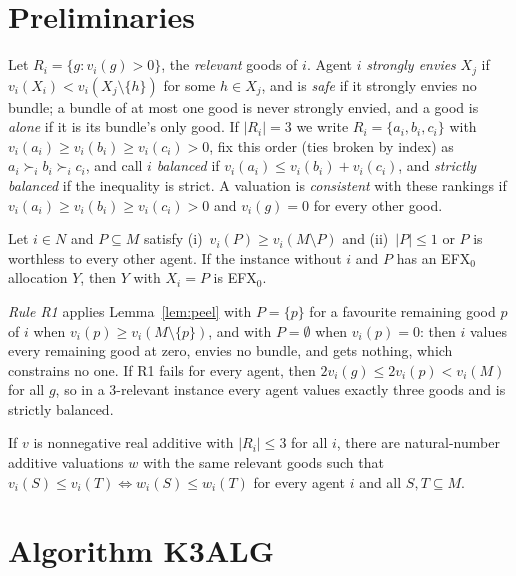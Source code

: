 \documentclass[runningheads,11pt]{llncs}
\newcommand{\efxz}{\texorpdfstring{\mbox{EFX$_0$}}{EFX0}}
\newcommand{\st}{\mathrel{:}}
\begin{document}
\section{Preliminaries}\label{sec:prelim}

Let $R_i=\{g\st v_i(g)>0\}$, the \emph{relevant} goods of $i$. Agent $i$ \emph{strongly envies} $X_j$ if $v_i(X_i)<v_i(X_j\setminus\{h\})$ for some $h\in X_j$, and is \emph{safe} if it strongly envies no bundle; a bundle of at most one good is never strongly envied, and a good is \emph{alone} if it is its bundle's only good. If $|R_i|=3$ we write $R_i=\{a_i,b_i,c_i\}$ with $v_i(a_i)\ge v_i(b_i)\ge v_i(c_i)>0$, fix this order (ties broken by index) as $a_i\succ_i b_i\succ_i c_i$, and call $i$ \emph{balanced} if $v_i(a_i)\le v_i(b_i)+v_i(c_i)$, and \emph{strictly balanced} if the inequality is strict. A valuation is \emph{consistent} with these rankings if $v_i(a_i)\ge v_i(b_i)\ge v_i(c_i)>0$ and $v_i(g)=0$ for every other good.

\begin{lemma}[peeling]\label{lem:peel}
Let $i\in N$ and $P\subseteq M$ satisfy (i)~$v_i(P)\ge v_i(M\setminus P)$ and (ii)~$|P|\le1$ or $P$ is worthless to every other agent. If the instance without $i$ and $P$ has an \efxz{} allocation $Y$, then $Y$ with $X_i=P$ is \efxz{}.
\end{lemma}

\noindent \emph{Rule R1} applies Lemma~\ref{lem:peel} with $P=\{p\}$ for a favourite remaining good $p$ of $i$ when $v_i(p)\ge v_i(M\setminus\{p\})$, and with $P=\emptyset$ when $v_i(p)=0$: then $i$ values every remaining good at zero, envies no bundle, and gets nothing, which constrains no one. If R1 fails for every agent, then $2v_i(g)\le2v_i(p)<v_i(M)$ for all $g$, so in a $3$-relevant instance every agent values exactly three goods and is strictly balanced.

\begin{lemma}\label{lem:L12}
If $v$ is nonnegative real additive with $|R_i|\le3$ for all $i$, there are natural-number additive valuations $w$ with the same relevant goods such that $v_i(S)\le v_i(T)\iff w_i(S)\le w_i(T)$ for every agent $i$ and all $S,T\subseteq M$.
\end{lemma}

\section{Algorithm K3ALG}\label{sec:algo}
\end{document}
